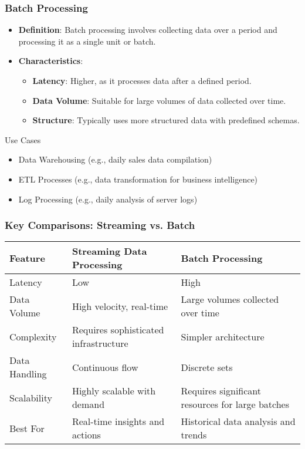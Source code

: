 \documentclass[aspectratio=169]{beamer}
\begin{document}
\begin{frame}[fragile]
    \frametitle{Batch Processing}
    \begin{itemize}
        \item \textbf{Definition}: Batch processing involves collecting data over a period and processing it as a single unit or batch.
        \item \textbf{Characteristics}:
        \begin{itemize}
            \item \textbf{Latency}: Higher, as it processes data after a defined period.
            \item \textbf{Data Volume}: Suitable for large volumes of data collected over time.
            \item \textbf{Structure}: Typically uses more structured data with predefined schemas.
        \end{itemize}
    \end{itemize}

    \begin{block}{Use Cases}
        \begin{itemize}
            \item Data Warehousing (e.g., daily sales data compilation)
            \item ETL Processes (e.g., data transformation for business intelligence)
            \item Log Processing (e.g., daily analysis of server logs)
        \end{itemize}
    \end{block}
\end{frame}

\begin{frame}[fragile]
    \frametitle{Key Comparisons: Streaming vs. Batch}
    \begin{center}
        \begin{tabular}{|l|l|l|}
            \hline
            \textbf{Feature} & \textbf{Streaming Data Processing} & \textbf{Batch Processing} \\
            \hline
            Latency & Low & High \\
            \hline
            Data Volume & High velocity, real-time & Large volumes collected over time \\
            \hline
            Complexity & Requires sophisticated infrastructure & Simpler architecture \\
            \hline
            Data Handling & Continuous flow & Discrete sets \\
            \hline
            Scalability & Highly scalable with demand & Requires significant resources for large batches \\
            \hline
            Best For & Real-time insights and actions & Historical data analysis and trends \\
            \hline
        \end{tabular}
    \end{center}
\end{frame}
\end{document}
